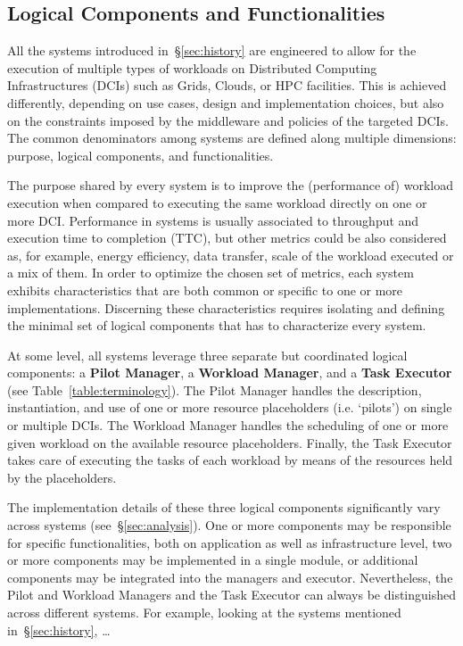 \documentclass{sig-alternate}
\begin{document}
\subsection{Logical Components and Functionalities}
\label{sec:compsandfuncs}

All the \pilot systems introduced in~\S\ref{sec:history} are engineered to
allow for the execution of multiple types of workloads on Distributed Computing
Infrastructures (DCIs) such as Grids, Clouds, or HPC facilities. This is
achieved differently, depending on use cases, design and implementation
choices, but also on the constraints imposed by the middleware and policies of
the targeted DCIs. The common denominators among \pilot systems are defined
along multiple dimensions: purpose, logical components, and functionalities.

The purpose shared by every \pilot system is to improve the (performance of)
workload execution when compared to executing the same workload directly on one
or more DCI. Performance in \pilot systems is usually associated to throughput
and execution time to completion (TTC), but other metrics could be also
considered as, for example, energy efficiency, data transfer, scale of the
workload executed or a mix of them. In order to optimize the chosen set of
metrics, each \pilot system exhibits characteristics that are both common or
specific to one or more implementations. Discerning these characteristics
requires isolating and defining the minimal set of logical components that has
to characterize every \pilot system.

At some level, all \pilot systems leverage three separate but coordinated
logical components: a \textbf{Pilot Manager}, a \textbf{Workload Manager}, and
a \textbf{Task Executor} (see Table~\ref{table:terminology}). The Pilot Manager
handles the description, instantiation, and use of one or more resource
placeholders (i.e. `pilots') on single or multiple DCIs. The Workload Manager
handles the scheduling of one or more given workload on the available resource
placeholders. Finally, the Task Executor takes care of executing the tasks of
each workload by means of the resources held by the placeholders.

The implementation details of these three logical components significantly vary
across \pilot systems (see~\S\ref{sec:analysis}). One or more components may be
responsible for specific functionalities, both on application as well as
infrastructure level, two or more components may be implemented in a single
module, or additional components may be integrated into the managers and
executor. Nevertheless, the Pilot and Workload Managers and the Task Executor
can always be distinguished across different \pilot systems. For example,
looking at the systems mentioned in~\S\ref{sec:history}, \ldots
{}
\end{document}
